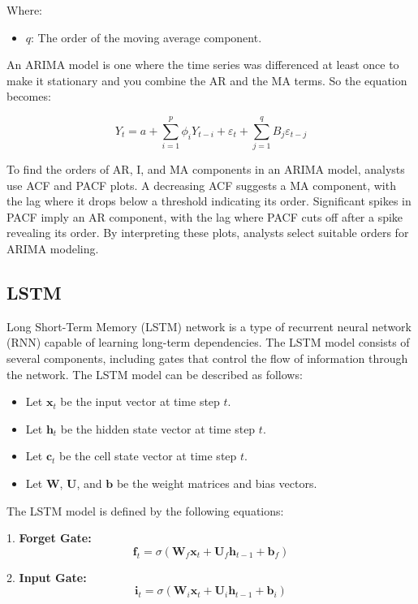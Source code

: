\documentclass{ieeeojies}
\begin{document}
Where:

\begin{itemize}
    \item $q$: The order of the moving average component.
\end{itemize}

An ARIMA model is one where the time series was differenced at least once to make it stationary and you combine the AR and the MA terms. So the equation becomes:

\begin{equation*}
Y_t = a + \sum_{i=1}^{p} \phi_i Y_{t-i} + \varepsilon_t + \sum_{j=1}^{q} B_j \varepsilon_{t-j}
\end{equation*}

To find the orders of AR, I, and MA components in an ARIMA model, analysts use ACF and PACF plots. A decreasing ACF suggests a MA component, with the lag where it drops below a threshold indicating its order. Significant spikes in PACF imply an AR component, with the lag where PACF cuts off after a spike revealing its order. By interpreting these plots, analysts select suitable orders for ARIMA modeling.

\subsection{LSTM}
Long Short-Term Memory (LSTM) network is a type of recurrent neural network (RNN) capable of learning long-term dependencies. The LSTM model consists of several components, including gates that control the flow of information through the network. The LSTM model can be described as follows:

\begin{itemize}
    \item Let $\mathbf{x}_t$ be the input vector at time step $t$.
    \item Let $\mathbf{h}_t$ be the hidden state vector at time step $t$.
    \item Let $\mathbf{c}_t$ be the cell state vector at time step $t$.
    \item Let $\mathbf{W}$, $\mathbf{U}$, and $\mathbf{b}$ be the weight matrices and bias vectors.
\end{itemize}

The LSTM model is defined by the following equations:

1. \textbf{Forget Gate:}
\[
\mathbf{f}_t = \sigma(\mathbf{W}_f \mathbf{x}_t + \mathbf{U}_f \mathbf{h}_{t-1} + \mathbf{b}_f)
\]

2. \textbf{Input Gate:}
\[
\mathbf{i}_t = \sigma(\mathbf{W}_i \mathbf{x}_t + \mathbf{U}_i \mathbf{h}_{t-1} + \mathbf{b}_i)
\]
\end{document}
